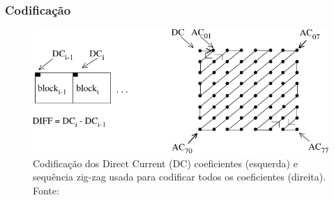\documentclass{beamer}
\begin{document}
\begin{frame}
\frametitle{Codificação}
\begin{figure}
\includegraphics[width=\textwidth]{figs/coding_jpeg.pdf}
\caption{Codificação dos Direct Current (DC) coeficientes (esquerda) e sequência zig-zag usada para codificar todos os coeficientes (direita). Fonte:~\cite{jpeg}}
\end{figure}
\end{frame}
\end{document}
